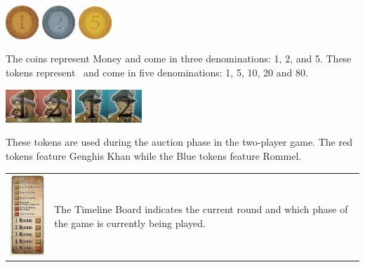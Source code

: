 \documentclass[10pt,twocolumn]{article}
\begin{document}
\centerline{\includegraphics[width=1.25cm]{1Money}  \includegraphics[width=1.25cm]{2Money}  \includegraphics[width=1.25cm]{5Money}}
The coins represent Money and come in three denominations: 1, 2, and 5.
These tokens represent \victorypoints\ and come in five denominations: 1, 5, 10, 20 and 80.
\centerline{\includegraphics[height=1.25cm]{AT1}\includegraphics[height=1.25cm]{AT2}  \includegraphics[height=1.25cm]{AT3}\includegraphics[height=1.25cm]{AT4}}
These tokens are used during the auction phase in the two-player game. The red tokens feature Genghis Khan while the Blue tokens feature Rommel.
\begin{tabular}{p{2cm} p{5cm}}
	\vspace{0pt}
	\includegraphics[width=2cm]{TimelineBoard}
	&
	\vspace{0pt}
The Timeline Board indicates the current round and which phase of the game is currently being played.
\end{tabular}
\end{document}
